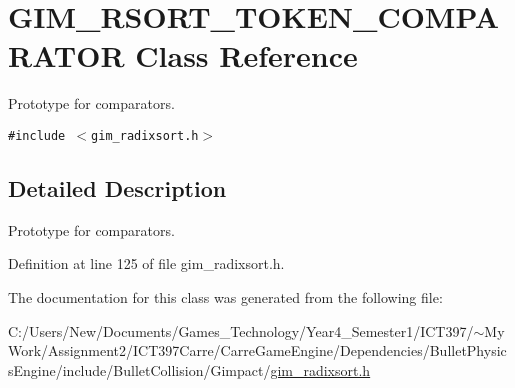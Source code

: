 \hypertarget{class_g_i_m___r_s_o_r_t___t_o_k_e_n___c_o_m_p_a_r_a_t_o_r}{
\section{GIM\_\-RSORT\_\-TOKEN\_\-COMPARATOR Class Reference}
\label{class_g_i_m___r_s_o_r_t___t_o_k_e_n___c_o_m_p_a_r_a_t_o_r}
}
Prototype for comparators.  


{\tt \#include $<$gim\_\-radixsort.h$>$}



\subsection{Detailed Description}
Prototype for comparators. 

Definition at line 125 of file gim\_\-radixsort.h.

The documentation for this class was generated from the following file:\begin{CompactItemize}
\item 
C:/Users/New/Documents/Games\_\-Technology/Year4\_\-Semester1/ICT397/$\sim$My Work/Assignment2/ICT397Carre/CarreGameEngine/Dependencies/BulletPhysicsEngine/include/BulletCollision/Gimpact/\hyperlink{gim__radixsort_8h}{gim\_\-radixsort.h}\end{CompactItemize}
